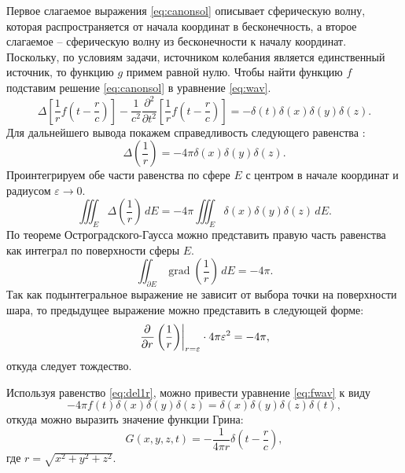 \documentclass[a4paper, fontsize=14pt]{article}
\newcommand{\gradop}{\operatorname{grad}}
\begin{document}
Первое слагаемое выражения \eqref{eq:canonsol} описывает сферическую волну, которая распространяется от начала координат в бесконечность, а второе слагаемое -- сферическую волну из бесконечности к началу координат. Поскольку, по условиям задачи, источником колебания является единственный источник, то функцию $g$ примем равной нулю.  Чтобы найти функцию  $f$  подставим решение \eqref{eq:canonsol} в уравнение \eqref{eq:wav}. 
\begin{equation}
	\Delta \left[ \frac{1}{r}f\left(t-\frac{r}{c}\right) \right] - \frac{1}{c^2} \frac{\partial^2 }{\partial
		t^2}\left[ \frac{1}{r}f\left(t-\frac{r}{c}\right) \right]  = - \delta(t)\delta(x)\delta(y)\delta(z).
		\label{eq:fwav}
\end{equation}
Для дальнейшего вывода покажем справедливость следующего равенства \cite{morse}:
	\begin{equation}
		\Delta\left(\frac{1}{r}\right) = -4\pi \delta(x)\delta(y)\delta(z).
		\label{eq:del1r}
	\end{equation}
Проинтегрируем обе части равенства по сфере $E$ с центром в начале координат и радиусом $\varepsilon \to 0$.
\begin{equation}
	\iiint_E \Delta\left(\frac{1}{r}\right) \, dE = -4\pi \iiint_E \delta(x)\delta(y)\delta(z) \, dE.
\end{equation}
По теореме Остроградского-Гаусса можно представить правую часть равенства как интеграл по поверхности сферы $E$.
\begin{equation}
	\iint_{\partial E} \gradop \left(\frac{1}{r}\right) \, dE = -4\pi.
\end{equation}
Так как подынтегральное выражение не зависит от выбора точки на поверхности шара, то предыдущее выражение можно представить в следующей форме:
\begin{equation}
	 \left.\frac{\partial ^ {  } {}}{\partial {r} ^ {  } }\left(\frac{1}{r}\right)\right|_{r=\varepsilon} \cdot 4\pi \varepsilon^2 = -4\pi,
\end{equation}	
откуда следует тождество.

Используя равенство \eqref{eq:del1r}, можно привести уравнение \eqref{eq:fwav}
к виду 
\begin{equation}
	-4\pi f(t) \delta(x) \delta(y) \delta(z)  = \delta(x) \delta(y) \delta(z) \delta(t),
\label{eq:fdel}	
\end{equation}
откуда можно выразить значение функции Грина:
\begin{equation}
	G(x,y,z,t) = -\frac{1}{4\pi r} \delta \left(t - \frac{r}{c}\right),
\label{eq:green3d0}	
\end{equation}  
где $r = \sqrt{x^2+y^2+z^2}$.
\end{document}
